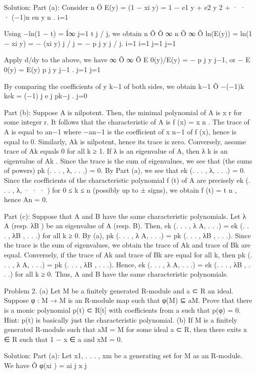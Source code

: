 \documentclass[UTF8,12pt]{ctexart}
\begin{document}
Solution: Part (a): Consider n Ö E(y) = (1 − xi y) = 1 − e1 y + e2 y 2 + · · · (−1)n en y n . i=1

Using −ln(1 − t) = Í∞ j=1 t j / j, we obtain n Õ Õ ∞ n Õ ∞ Õ ln(E(y)) = ln(1 − xi y) = − (xi y) j / j = − p j y j / j. i=1 i=1 j=1 j=1

Apply d/dy to the above, we have ∞ Õ ∞ Õ E 0(y)/E(y) = − p j y j−1, or − E 0(y) = E(y) p j y j−1 . j=1 j=1

By comparing the coefficients of y k−1 of both sides, we obtain k−1 Õ −(−1)k kek = (−1) j e j pk−j . j=0

Part (b): Suppose A is nilpotent. Then, the minimal polynomial of A is x r for some integer r. It follows that the characteristic of A is f (x) = x n . The trace of A is equal to an−1 where −an−1 is the coefficient of x n−1 of f (x), hence is equal to 0. Similarly, Ak is nilpotent, hence its trace is zero. Conversely, assume trace of Ak equals 0 for all k ≥ 1. If λ is an eigenvalue of A, then λ k is an eigenvalue of Ak . Since the trace is the sum of eigenvalues, we see that (the sums of powers) pk (. . . , λ, . . .) = 0. By Part (a), we see that ek (. . . , λ, . . .) = 0. Since the coefficients of the characteristic polynomial f (t) of A are precisely ek (. . . , λ, · · · ) for 0 ≤ k ≤ n (possibly up to ± signs), we obtain f (t) = t n , hence An = 0.

Part (c): Suppose that A and B have the same characteristic polynomials. Let λ A (resp. λB ) be an eigenvalue of A (resp. B). Then, ek (. . . , λ A, . . .) = ek (. . . , λB , . . .) for all k ≥ 0. By (a), pk (. . . , λ A, . . .) = pk (. . . , λB , . . .). Since the trace is the sum of eigenvalues, we obtain the trace of Ak and trace of Bk are equal. Conversely, if the trace of Ak and trace of Bk are equal for all k, then pk (. . . , λ A, . . .) = pk (. . . , λB , . . .). Hence, ek (. . . , λ A, . . .) = ek (. . . , λB , . . .) for all k ≥ 0. Thus, A and B have the same characteristic polynomials.

Problem 2. (a) Let M be a finitely generated R-module and a ⊂ R an ideal. Suppose φ : M → M is an R-module map such that φ(M) ⊆ aM. Prove that there is a monic polynomial p(t) ⊂ R[t] with coefficients from a such that p(φ) = 0. Hint: p(t) is basically just the characteristic polynomial. (b) If M is a finitely generated R-module such that aM = M for some ideal a ⊂ R, then there exits x ∈ R such that 1 − x ∈ a and xM = 0.

Solution: Part (a): Let x1, . . . , xm be a generating set for M as an R-module. We have Õ φ(xi ) = ai j x j
\end{document}
